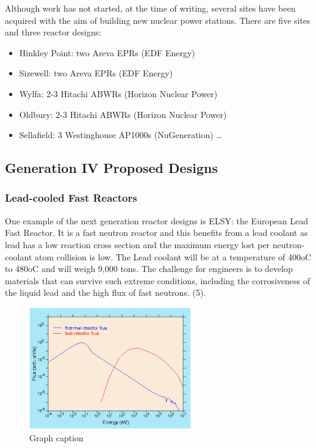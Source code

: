 Although work has not started, at the time of writing, several sites have been acquired with the aim of building new nuclear power stations.  There are five sites and three reactor designs\cite{ocw01}:
\begin{itemize}
\item Hinkley Point: two Areva EPRs (EDF Energy)
\item Sizewell: two Areva EPRs (EDF Energy)
\item Wylfa: 2-3 Hitachi ABWRs (Horizon Nuclear Power)
\item Oldbury: 2-3 Hitachi ABWRs (Horizon Nuclear Power)
\item Sellafield: 3 Westinghouse AP1000s (NuGeneration)
\ldots 
\end{itemize}






\subsection{Generation IV Proposed Designs}






\subsubsection{Lead-cooled Fast Reactors}

One example of the next generation reactor designs is ELSY: the European Lead Fast Reactor.  It is a fast neutron reactor and this benefits from a lead coolant as lead has a low reaction cross section and the maximum energy lost per neutron-coolant atom collision is low.  The Lead coolant will be at a temperature of 400oC to 480oC\cite{elsy01} and will weigh 9,000 tons.  The challenge for engineers is to develop materials that can survive such extreme conditions, including the corrosiveness of the liquid lead and the high flux of fast neutrons.   (5).

\begin{figure}[tbp]
  \begin{center}
    \includegraphics[width=7.0cm]{chapters/introduction/images/reactor-flux.png}
    \caption{Graph caption}
    \label{image:flux1}
  \end{center}
\end{figure}


